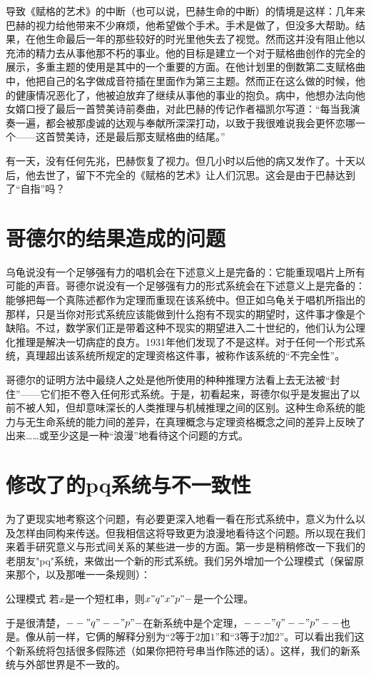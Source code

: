 导致《赋格的艺术》的中断（也可以说，巴赫生命的中断）的情境是这样：几年来巴赫的视力给他带来不少麻烦，他希望做个手术。手术是做了，但没多大帮助。结果，在他生命最后一年的那些较好的时光里他失去了视觉。然而这并没有阻止他以充沛的精力去从事他那不朽的事业。他的目标是建立一个对于赋格曲创作的完全的展示，多重主题的使用是其中的一个重要的方面。在他计划里的倒数第二支赋格曲中，他把自己的名字做成音符插在里面作为第三主题。然而正在这么做的时候，他的健康情况恶化了，他被迫放弃了继续从事他的事业的抱负。病中，他想办法向他女婿口授了最后一首赞美诗前奏曲，对此巴赫的传记作者福凯尔写道：“每当我演奏一遍，都会被那虔诚的达观与奉献所深深打动，以致于我很难说我会更怀恋哪一个——这首赞美诗，还是最后那支赋格曲的结尾。”

有一天，没有任何先兆，巴赫恢复了视力。但几小时以后他的病又发作了。十天以后，他去世了，留下不完全的《赋格的艺术》让人们沉思。这会是由于巴赫达到了“自指”吗？

\section{哥德尔的结果造成的问题}

乌龟说没有一个足够强有力的唱机会在下述意义上是完备的：它能重现唱片上所有可能的声音。哥德尔说没有一个足够强有力的形式系统会在下述意义上是完备的：能够把每一个真陈述都作为定理而重现在该系统中。但正如乌龟关于唱机所指出的那样，只是当你对形式系统应该能做到什么抱有不现实的期望时，这件事才像是个缺陷。不过，数学家们正是带着这种不现实的期望进入二十世纪的，他们认为公理化推理是解决一切病症的良方。1931年他们发现了不是这样。对于任何一个形式系统，真理超出该系统所规定的定理资格这件事，被称作该系统的“不完全性”。

哥德尔的证明方法中最绕人之处是他所使用的种种推理方法看上去无法被“封住”——它们拒不卷入任何形式系统。于是，初看起来，哥德尔似乎是发掘出了以前不被人知，但却意味深长的人类推理与机械推理之间的区别。这种生命系统的能力与无生命系统的能力间的差异，在真理概念与定理资格概念之间的差异上反映了出来……或至少这是一种“浪漫”地看待这个问题的方式。

\section{修改了的pq系统与不一致性}

为了更现实地考察这个问题，有必要更深入地看一看在形式系统中，意义为什么以及怎样由同构来传送。但我相信这将导致更为浪漫地看待这个问题。所以现在我们来着手研究意义与形式间关系的某些进一步的方面。第一步是稍稍修改一下我们的老朋友"pq"系统，来做出一个新的形式系统。我们另外增加一个公理模式（保留原来那个，以及那唯一一条规则）：
\begin{thm}{公理模式}
若$x$是一个短杠串，则$x"q"x"p"-$是一个公理。
\end{thm}
于是很清楚，$--"q"--"p"-$在新系统中是个定理，$---"q"--"p"--$也是。像从前一样，它俩的解释分别为“$2$等于$2$加$1$”和“$3$等于$2$加$2$”。可以看出我们这个新系统将包括很多假陈述（如果你把符号串当作陈述的话）。这样，我们的新系统与外部世界是不一致的。

